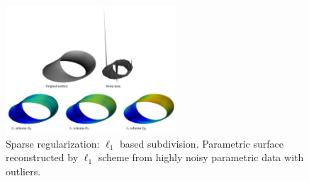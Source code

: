 \begin{figure}[ht]
  \centering
  \includegraphics[width=2.5in]{images/subdivision}
  \caption{Sparse regularization: $\ell_1$ based subdivision\cite{mustafa2014subdivision}. Parametric surface reconstructed by $\ell_1$ scheme from highly noisy parametric data with outliers.}
  \label{fig:subdivision}
\end{figure} 